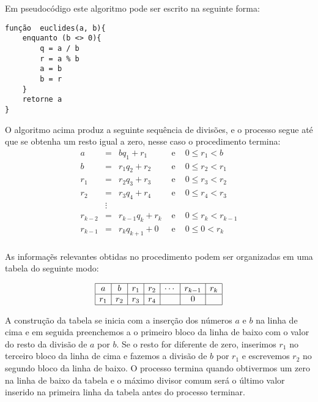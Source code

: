 Em pseudoc\'odigo este algoritmo pode ser escrito na seguinte forma:

\begin{verbatim}
função  euclides(a, b){
    enquanto (b <> 0){
        q = a / b 
        r = a % b
        a = b 
        b = r
    }
    retorne a
}
\end{verbatim} 

O algoritmo acima produz a seguinte sequ\^{e}ncia de divis\~{o}es, e o processo segue at\'{e}
que se obtenha um resto igual a zero, nesse caso o procedimento termina:
\[
\begin{array}{rclcl}
a   		& =      & bq_{1}+r_{1} 			    & \textrm{ e } & 0\leq r_{1}<b       \\
b   		& =      & r_{1}q_{2}+r_{2} 	    & \textrm{ e } & 0\leq r_{2}<r_{1}       \\
r_{1}		& =      & r_{2}q_{3}+r_{3} 	    & \textrm{ e } & 0\leq r_{3}<r_{2}       \\
r_{2}   & =      & r_{3}q_{4}+r_{4} 	    & \textrm{ e } & 0\leq r_{4}<r_{3}       \\
        & \vdots &     		          	    &              &                     \\
r_{k-2} & =      & r_{k-1}q_{k}+r_{k}     & \textrm{ e } & 0\leq r_{k}<r_{k-1} \\				
r_{k-1} & =      & r_{k}q_{k+1}+ 0        & \textrm{ e } & 0\leq 0    <r_{k} \\		
\end{array}
\]  

As informa\c{c}\~{e}s relevantes obtidas no procedimento podem ser organizadas em uma tabela do seguinte modo:

\[
\begin{array}{|c|c|c|c|c|c|c|}\hline
	a     & b     & r_{1} & r_{2} & \cdots & r_{k-1} & r_{k}\\ \hline
	r_{1}	& r_{2} & r_{3} & r_{4} &        & 0       &  \\ \hline
\end{array}
\]

A constru\c{c}\~{a}o da tabela se inicia com a inser\c{c}\~{a}o dos n\'{u}meros $a$ e $b$ na linha de cima e em seguida preenchemos
a o primeiro bloco da linha de baixo com o valor do resto da divis\~{a}o de $a$ por $b$. Se o resto for diferente de zero, 
inserimos $r_{1}$ no terceiro bloco da linha de cima e fazemos a divis\~{a}o de $b$ por $r_{1}$ e escrevemos
$r_{2}$ no segundo bloco da linha de baixo.
O processo termina quando obtivermos um zero na linha de baixo da tabela e o m\'{a}ximo divisor comum ser\'{a} o 
\'{u}ltimo valor inserido na primeira linha da tabela antes do processo terminar. 

